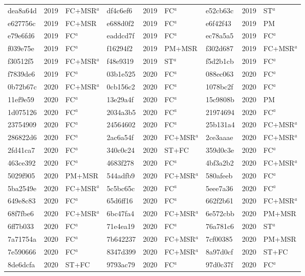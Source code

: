 \begin{longtable}{lll@{\hspace{10pt}}lll@{\hspace{10pt}}lll}
dea8a64d & 2019 & FC+MSR$^{a}$ & df4c6ef6 & 2019 & FC$^{a}$ & e52cb63c & 2019 & ST$^{a}$ \\
e627756c & 2019 & FC+MSR & e688d0f2 & 2019 & FC$^{a}$ & e6f42f43 & 2019 & PM \\
e79e6fd6 & 2019 & FC$^{a}$ & eaddcd7f & 2019 & FC$^{a}$ & ec78a5a5 & 2019 & FC$^{a}$ \\
f039e75e & 2019 & FC$^{a}$ & f16294f2 & 2019 & PM+MSR & f302d687 & 2019 & FC+MSR$^{a}$ \\
f30512f5 & 2019 & FC+MSR$^{a}$ & f48e9319 & 2019 & ST$^{a}$ & f5d2b1cb & 2019 & FC$^{a}$ \\
f7839de6 & 2019 & FC$^{a}$ & 03b1e525 & 2020 & FC$^{a}$ & 088ec063 & 2020 & FC$^{a}$ \\
0b72b67c & 2020 & FC+MSR$^{a}$ & 0cb156c2 & 2020 & FC$^{a}$ & 1078bc2f & 2020 & FC$^{a}$ \\
11ef9e59 & 2020 & FC$^{a}$ & 13e29a4f & 2020 & FC$^{a}$ & 15c9808b & 2020 & PM \\
1d075126 & 2020 & FC$^{a}$ & 2034a3b5 & 2020 & FC$^{a}$ & 21974694 & 2020 & FC$^{a}$ \\
23754909 & 2020 & FC$^{a}$ & 24564602 & 2020 & FC$^{a}$ & 25b131a4 & 2020 & FC+MSR$^{a}$ \\
286822d6 & 2020 & FC$^{a}$ & 2ac6a54f & 2020 & FC+MSR$^{a}$ & 2ce3aaae & 2020 & FC+MSR$^{a}$ \\
2fd41ca7 & 2020 & FC$^{a}$ & 340c0c24 & 2020 & ST+FC & 359d0c3e & 2020 & FC$^{a}$ \\
463ce392 & 2020 & FC$^{a}$ & 4683f278 & 2020 & FC$^{a}$ & 4bf3a2b2 & 2020 & FC+MSR$^{a}$ \\
5029f905 & 2020 & PM+MSR & 544adfb9 & 2020 & FC+MSR$^{a}$ & 580afeeb & 2020 & FC$^{a}$ \\
5ba2549e & 2020 & FC+MSR$^{a}$ & 5c5bc65c & 2020 & FC$^{a}$ & 5eee7a36 & 2020 & FC$^{a}$ \\
649e8c83 & 2020 & FC$^{a}$ & 65d6ff16 & 2020 & FC$^{a}$ & 662f2b61 & 2020 & FC+MSR$^{a}$ \\
68f7fbe6 & 2020 & FC+MSR$^{a}$ & 6bc47fa4 & 2020 & FC+MSR$^{a}$ & 6e572cbb & 2020 & PM+MSR \\
6ff7b033 & 2020 & FC$^{a}$ & 71e4ea19 & 2020 & FC$^{a}$ & 76a781c6 & 2020 & ST$^{a}$ \\
7a71754a & 2020 & FC$^{a}$ & 7b642237 & 2020 & FC+MSR$^{a}$ & 7cf00385 & 2020 & PM+MSR \\
7e590666 & 2020 & FC$^{a}$ & 8347d399 & 2020 & FC+MSR$^{a}$ & 8a97d0cf & 2020 & ST+FC \\
8de6dcfa & 2020 & ST+FC & 9793ac79 & 2020 & FC$^{a}$ & 97d0c37f & 2020 & FC$^{a}$ \\

\end{longtable}
